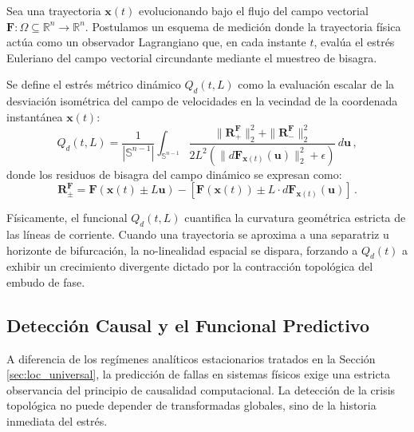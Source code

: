 \documentclass[11pt]{article}
\begin{document}
Sea una trayectoria $\mathbf{x}(t)$ evolucionando bajo el flujo del campo vectorial $\mathbf{F}: \Omega \subseteq \mathbb{R}^n \to \mathbb{R}^n$. Postulamos un esquema de medición donde la trayectoria física actúa como un observador Lagrangiano que, en cada instante $t$, evalúa el estrés Euleriano del campo vectorial circundante mediante el muestreo de bisagra.

\begin{definition}
Se define el estrés métrico dinámico $Q_d(t, L)$ como la evaluación escalar de la desviación isométrica del campo de velocidades en la vecindad de la coordenada instantánea $\mathbf{x}(t)$:
\begin{equation}
    \label{eq:estres_flujo}
    Q_d(t, L) = \frac{1}{|\mathbb{S}^{n-1}|} \int_{\mathbb{S}^{n-1}} \frac{\|\mathbf{R}_+^{\mathbf{F}}\|_2^2 + \|\mathbf{R}_-^{\mathbf{F}}\|_2^2}{2L^2 (\|d\mathbf{F}_{\mathbf{x}(t)}(\mathbf{u})\|_2^2 + \epsilon)} \, d\mathbf{u} \,,
\end{equation}
donde los residuos de bisagra del campo dinámico se expresan como:
\begin{equation*}
    \mathbf{R}_{\pm}^{\mathbf{F}} = \mathbf{F}(\mathbf{x}(t) \pm L\mathbf{u}) - [\mathbf{F}(\mathbf{x}(t)) \pm L \cdot d\mathbf{F}_{\mathbf{x}(t)}(\mathbf{u})] \,.
\end{equation*}
\end{definition}

Físicamente, el funcional $Q_d(t, L)$ cuantifica la curvatura geométrica estricta de las líneas de corriente. Cuando una trayectoria se aproxima a una separatriz u horizonte de bifurcación, la no-linealidad espacial se dispara, forzando a $Q_d(t)$ a exhibir un crecimiento divergente dictado por la contracción topológica del embudo de fase.

\subsection{Detección Causal y el Funcional Predictivo}
\label{sec:funcional_pred}
A diferencia de los regímenes analíticos estacionarios tratados en la Sección \ref{sec:loc_universal}, la predicción de fallas en sistemas físicos exige una estricta observancia del principio de causalidad computacional. La detección de la crisis topológica no puede depender de transformadas globales, sino de la historia inmediata del estrés.
\end{document}
